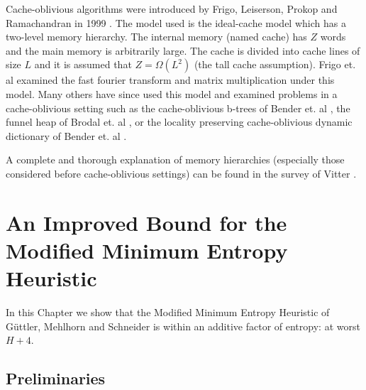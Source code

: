 \documentclass[letterpaper,12pt,titlepage,oneside,final]{book}
\theoremstyle{plain}
\begin{document}
Cache-oblivious algorithms were introduced by Frigo, Leiserson, Prokop and Ramachandran in 1999 \cite{frigo1999cache}. The model used is the ideal-cache model which has a two-level memory hierarchy. The internal memory (named cache) has $Z$ words and the main memory is arbitrarily large. The cache is divided into cache lines of size $L$ and it is assumed that $Z=\Omega(L^2)$ (the tall cache assumption). Frigo et. al examined the fast fourier transform and matrix multiplication under this model. Many others have since used this model and examined problems in a cache-oblivious setting such as the cache-oblivious b-trees of Bender et. al \cite{bender2000cache}, the funnel heap of Brodal et. al \cite{brodai2002funnel}, or the locality preserving cache-oblivious dynamic dictionary of Bender et. al \cite{bender2002locality}.

A complete and thorough explanation of memory hierarchies (especially those considered before cache-oblivious settings) can be found in the survey of Vitter \cite{vitter2001external}.



\chapter{An Improved Bound for the Modified Minimum Entropy Heuristic}\label{An Improved Bound for the Modified Minimum Entropy Heuristic}

In this Chapter we show that the Modified Minimum Entropy Heuristic of G{\"u}ttler, Mehlhorn and Schneider \cite{guttler1980binary} is within an additive factor of entropy: at worst $H+4$.

\section{Preliminaries}
\end{document}
